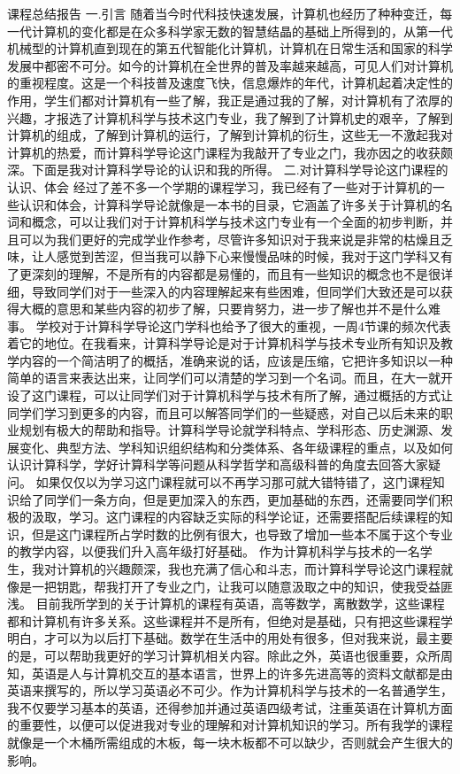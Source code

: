                                                课程总结报告                 
  一.引言
   随着当今时代科技快速发展，计算机也经历了种种变迁，每一代计算机的变化都是在众多科学家无数的智慧结晶的基础上所得到的，从第一代机械型的计算机直到现在的第五代智能化计算机，计算机在日常生活和国家的科学发展中都密不可分。如今的计算机在全世界的普及率越来越高，可见人们对计算机的重视程度。这是一个科技普及速度飞快，信息爆炸的年代，计算机起着决定性的作用，学生们都对计算机有一些了解，我正是通过我的了解，对计算机有了浓厚的兴趣，才报选了计算机科学与技术这门专业，我了解到了计算机史的艰辛，了解到计算机的组成，了解到计算机的运行，了解到计算机的衍生，这些无一不激起我对计算机的热爱，而计算科学导论这门课程为我敲开了专业之门，我亦因之的收获颇深。下面是我对计算科学导论的认识和我的所得。
   二.对计算科学导论这门课程的认识、体会
    经过了差不多一个学期的课程学习，我已经有了一些对于计算机的一些认识和体会，计算科学导论就像是一本书的目录，它涵盖了许多关于计算机的名词和概念，可以让我们对于计算机科学与技术这门专业有一个全面的初步判断，并且可以为我们更好的完成学业作参考，尽管许多知识对于我来说是非常的枯燥且乏味，让人感觉到苦涩，但当我可以静下心来慢慢品味的时候，我对于这门学科又有了更深刻的理解，不是所有的内容都是易懂的，而且有一些知识的概念也不是很详细，导致同学们对于一些深入的内容理解起来有些困难，但同学们大致还是可以获得大概的意思和某些内容的初步了解，只要肯努力，进一步了解也并不是什么难事。
   学校对于计算科学导论这门学科也给予了很大的重视，一周4节课的频次代表着它的地位。在我看来，计算科学导论是对于计算机科学与技术专业所有知识及教学内容的一个简洁明了的概括，准确来说的话，应该是压缩，它把许多知识以一种简单的语言来表达出来，让同学们可以清楚的学习到一个名词。而且，在大一就开设了这门课程，可以让同学们对于计算机科学与技术有所了解，通过概括的方式让同学们学习到更多的内容，而且可以解答同学们的一些疑惑，对自己以后未来的职业规划有极大的帮助和指导。计算科学导论就学科特点、学科形态、历史渊源、发展变化、典型方法、学科知识组织结构和分类体系、各年级课程的重点，以及如何认识计算科学，学好计算科学等问题从科学哲学和高级科普的角度去回答大家疑问。
   如果仅仅以为学习这门课程就可以不再学习那可就大错特错了，这门课程知识给了同学们一条方向，但是更加深入的东西，更加基础的东西，还需要同学们积极的汲取，学习。这门课程的内容缺乏实际的科学论证，还需要搭配后续课程的知识，但是这门课程所占学时数的比例有很大，也导致了增加一些本不属于这个专业的教学内容，以便我们升入高年级打好基础。
    作为计算机科学与技术的一名学生，我对计算机的兴趣颇深，我也充满了信心和斗志，而计算科学导论这门课程就像是一把钥匙，帮我打开了专业之门，让我可以随意汲取之中的知识，使我受益匪浅。
    目前我所学到的关于计算机的课程有英语，高等数学，离散数学，这些课程都和计算机有许多关系。这些课程并不是所有，但绝对是基础，只有把这些课程学明白，才可以为以后打下基础。数学在生活中的用处有很多，但对我来说，最主要的是，可以帮助我更好的学习计算机相关内容。除此之外，英语也很重要，众所周知，英语是人与计算机交互的基本语言，世界上的许多先进高等的资料文献都是由英语来撰写的，所以学习英语必不可少。作为计算机科学与技术的一名普通学生，我不仅要学习基本的英语，还得参加并通过英语四级考试，注重英语在计算机方面的重要性，以便可以促进我对专业的理解和对计算机知识的学习。所有我学的课程就像是一个木桶所需组成的木板，每一块木板都不可以缺少，否则就会产生很大的影响。
